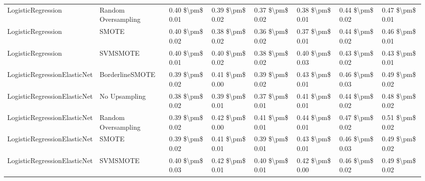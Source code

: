 \begin{tabular}{llllllll}
             LogisticRegression &           Random Oversampling & 0.40 \$\textbackslash pm\$ 0.01 &           0.39 \$\textbackslash pm\$ 0.02 &       0.37 \$\textbackslash pm\$ 0.02 &        0.38 \$\textbackslash pm\$ 0.01 &                         0.44 \$\textbackslash pm\$ 0.02 &     0.47 \$\textbackslash pm\$ 0.01 \\
             LogisticRegression &                         SMOTE & 0.40 \$\textbackslash pm\$ 0.02 &           0.38 \$\textbackslash pm\$ 0.02 &       0.36 \$\textbackslash pm\$ 0.02 &        0.37 \$\textbackslash pm\$ 0.01 &                         0.44 \$\textbackslash pm\$ 0.02 &     0.46 \$\textbackslash pm\$ 0.01 \\
             LogisticRegression &                      SVMSMOTE & 0.40 \$\textbackslash pm\$ 0.01 &           0.40 \$\textbackslash pm\$ 0.02 &       0.38 \$\textbackslash pm\$ 0.02 &        0.40 \$\textbackslash pm\$ 0.03 &                         0.43 \$\textbackslash pm\$ 0.02 &     0.43 \$\textbackslash pm\$ 0.01 \\
   LogisticRegressionElasticNet &               BorderlineSMOTE & 0.39 \$\textbackslash pm\$ 0.02 &           0.41 \$\textbackslash pm\$ 0.00 &       0.39 \$\textbackslash pm\$ 0.02 &        0.43 \$\textbackslash pm\$ 0.01 &                         0.46 \$\textbackslash pm\$ 0.03 &     0.49 \$\textbackslash pm\$ 0.02 \\
   LogisticRegressionElasticNet &                 No Upsampling & 0.38 \$\textbackslash pm\$ 0.02 &           0.39 \$\textbackslash pm\$ 0.01 &       0.37 \$\textbackslash pm\$ 0.01 &        0.41 \$\textbackslash pm\$ 0.01 &                         0.44 \$\textbackslash pm\$ 0.02 &     0.48 \$\textbackslash pm\$ 0.02 \\
   LogisticRegressionElasticNet &           Random Oversampling & 0.39 \$\textbackslash pm\$ 0.02 &           0.42 \$\textbackslash pm\$ 0.00 &       0.41 \$\textbackslash pm\$ 0.01 &        0.44 \$\textbackslash pm\$ 0.01 &                         0.47 \$\textbackslash pm\$ 0.02 &     0.51 \$\textbackslash pm\$ 0.02 \\
   LogisticRegressionElasticNet &                         SMOTE & 0.39 \$\textbackslash pm\$ 0.02 &           0.41 \$\textbackslash pm\$ 0.01 &       0.39 \$\textbackslash pm\$ 0.01 &        0.43 \$\textbackslash pm\$ 0.01 &                         0.46 \$\textbackslash pm\$ 0.03 &     0.49 \$\textbackslash pm\$ 0.02 \\
   LogisticRegressionElasticNet &                      SVMSMOTE & 0.40 \$\textbackslash pm\$ 0.03 &           0.42 \$\textbackslash pm\$ 0.01 &       0.40 \$\textbackslash pm\$ 0.01 &        0.42 \$\textbackslash pm\$ 0.00 &                         0.46 \$\textbackslash pm\$ 0.02 &     0.49 \$\textbackslash pm\$ 0.02 \\

\end{tabular}
